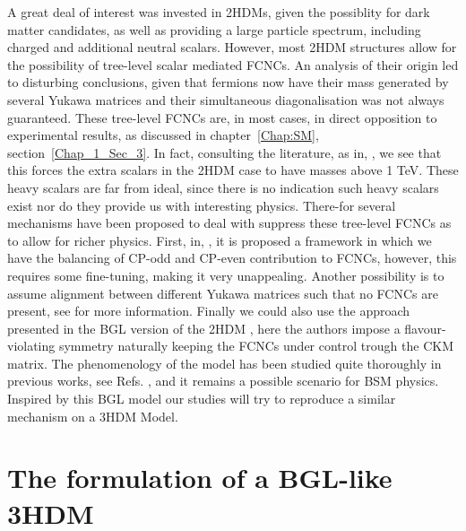 A great deal of interest was invested in 2HDMs, given the possiblity for dark matter candidates, as well as providing a large particle spectrum, including charged and additional neutral scalars.
%
However, most 2HDM structures allow for the possibility of tree-level scalar mediated FCNCs. 
% 
An analysis of their origin led to disturbing conclusions, given that fermions now have their mass generated by several Yukawa matrices and their simultaneous diagonalisation was not always guaranteed. 
%
These tree-level FCNCs are, in most cases, in direct opposition to experimental results, as discussed in chapter~\ref{Chap:SM}, section~\ref{Chap_1_Sec_3}. 
%
In fact, consulting the literature, as in, \cite{Branco:1999fs}, we see that this forces the extra scalars in the 2HDM case to have masses above 1 TeV.
%
These heavy scalars are far from ideal, since there is no indication such heavy scalars exist nor do they provide us with interesting physics. 
%
There-for several mechanisms have been proposed to deal with suppress these tree-level FCNCs as to allow for richer physics. 
%
First, in, \cite{Ferreira_2011,Nebot_2015,ferreira2019strong}, it is proposed a framework in which we have the balancing of CP-odd and CP-even contribution to FCNCs, however, this requires some fine-tuning, making it very unappealing. 
% 
Another possibility is to assume alignment between different Yukawa matrices such that no FCNCs are present, see \cite{Pich_2009,Jung_2010,Jung_2011} for more information. 
%
Finally we could also use the approach presented in the BGL version of the 2HDM \cite{Branco_1996,LAVOURA1994}, here the authors impose a flavour-violating symmetry naturally keeping the FCNCs under control trough the CKM matrix. 
%
The phenomenology of the model has been studied quite thoroughly in previous works, see Refs. \cite{Botella_2014,Botella_2016}, and it remains a possible scenario for BSM physics.
%
Inspired by this BGL model our studies will try to reproduce a similar mechanism on a 3HDM Model. 


\section{The formulation of a BGL-like 3HDM} 


